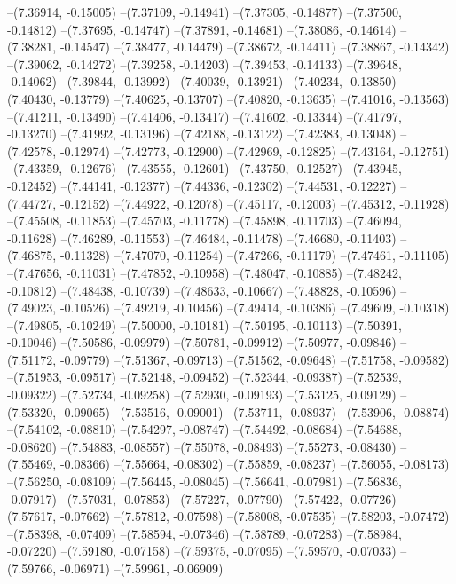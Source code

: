 --(7.36914, -0.15005)
--(7.37109, -0.14941)
--(7.37305, -0.14877)
--(7.37500, -0.14812)
--(7.37695, -0.14747)
--(7.37891, -0.14681)
--(7.38086, -0.14614)
--(7.38281, -0.14547)
--(7.38477, -0.14479)
--(7.38672, -0.14411)
--(7.38867, -0.14342)
--(7.39062, -0.14272)
--(7.39258, -0.14203)
--(7.39453, -0.14133)
--(7.39648, -0.14062)
--(7.39844, -0.13992)
--(7.40039, -0.13921)
--(7.40234, -0.13850)
--(7.40430, -0.13779)
--(7.40625, -0.13707)
--(7.40820, -0.13635)
--(7.41016, -0.13563)
--(7.41211, -0.13490)
--(7.41406, -0.13417)
--(7.41602, -0.13344)
--(7.41797, -0.13270)
--(7.41992, -0.13196)
--(7.42188, -0.13122)
--(7.42383, -0.13048)
--(7.42578, -0.12974)
--(7.42773, -0.12900)
--(7.42969, -0.12825)
--(7.43164, -0.12751)
--(7.43359, -0.12676)
--(7.43555, -0.12601)
--(7.43750, -0.12527)
--(7.43945, -0.12452)
--(7.44141, -0.12377)
--(7.44336, -0.12302)
--(7.44531, -0.12227)
--(7.44727, -0.12152)
--(7.44922, -0.12078)
--(7.45117, -0.12003)
--(7.45312, -0.11928)
--(7.45508, -0.11853)
--(7.45703, -0.11778)
--(7.45898, -0.11703)
--(7.46094, -0.11628)
--(7.46289, -0.11553)
--(7.46484, -0.11478)
--(7.46680, -0.11403)
--(7.46875, -0.11328)
--(7.47070, -0.11254)
--(7.47266, -0.11179)
--(7.47461, -0.11105)
--(7.47656, -0.11031)
--(7.47852, -0.10958)
--(7.48047, -0.10885)
--(7.48242, -0.10812)
--(7.48438, -0.10739)
--(7.48633, -0.10667)
--(7.48828, -0.10596)
--(7.49023, -0.10526)
--(7.49219, -0.10456)
--(7.49414, -0.10386)
--(7.49609, -0.10318)
--(7.49805, -0.10249)
--(7.50000, -0.10181)
--(7.50195, -0.10113)
--(7.50391, -0.10046)
--(7.50586, -0.09979)
--(7.50781, -0.09912)
--(7.50977, -0.09846)
--(7.51172, -0.09779)
--(7.51367, -0.09713)
--(7.51562, -0.09648)
--(7.51758, -0.09582)
--(7.51953, -0.09517)
--(7.52148, -0.09452)
--(7.52344, -0.09387)
--(7.52539, -0.09322)
--(7.52734, -0.09258)
--(7.52930, -0.09193)
--(7.53125, -0.09129)
--(7.53320, -0.09065)
--(7.53516, -0.09001)
--(7.53711, -0.08937)
--(7.53906, -0.08874)
--(7.54102, -0.08810)
--(7.54297, -0.08747)
--(7.54492, -0.08684)
--(7.54688, -0.08620)
--(7.54883, -0.08557)
--(7.55078, -0.08493)
--(7.55273, -0.08430)
--(7.55469, -0.08366)
--(7.55664, -0.08302)
--(7.55859, -0.08237)
--(7.56055, -0.08173)
--(7.56250, -0.08109)
--(7.56445, -0.08045)
--(7.56641, -0.07981)
--(7.56836, -0.07917)
--(7.57031, -0.07853)
--(7.57227, -0.07790)
--(7.57422, -0.07726)
--(7.57617, -0.07662)
--(7.57812, -0.07598)
--(7.58008, -0.07535)
--(7.58203, -0.07472)
--(7.58398, -0.07409)
--(7.58594, -0.07346)
--(7.58789, -0.07283)
--(7.58984, -0.07220)
--(7.59180, -0.07158)
--(7.59375, -0.07095)
--(7.59570, -0.07033)
--(7.59766, -0.06971)
--(7.59961, -0.06909)
